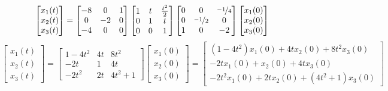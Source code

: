 \documentclass[a3paper,14pt]{extarticle}
\begin{document}
$$\begin{bmatrix}
    x_1(t) \\ x_2(t) \\ x_3(t)
\end{bmatrix} = \begin{bmatrix}
    -8 & 0 & 1 \\ 0 & -2 & 0 \\ -4 & 0 & 0
\end{bmatrix} \begin{bmatrix}
    1 & t & \frac{t^2}{2} \\ 0 & 1 & t \\ 0 & 0 & 1
\end{bmatrix} \begin{bmatrix}
    0 & 0 & \nicefrac{-1}{4} \\ 0 & \nicefrac{-1}{2} & 0 \\ 1 & 0 & -2
\end{bmatrix}\begin{bmatrix}
    x_1(0) \\ x_2(0) \\ x_3(0)
\end{bmatrix}$$
$$\begin{bmatrix}
    x_1(t) \\ x_2(t) \\ x_3(t)
\end{bmatrix} = \begin{bmatrix}
    1-4t^2 & 4t & 8t^2 \\ -2t & 1 & 4t \\ -2t^2 & 2t & 4t^2+1
\end{bmatrix}\begin{bmatrix}
    x_1(0) \\ x_2(0) \\ x_3(0)
\end{bmatrix} = \begin{bmatrix}
    (1 - 4t^2)x_1(0) + 4tx_2(0) + 8t^2x_3(0) \\
    -2tx_1(0)+x_2(0)+4tx_3(0) \\
    -2t^2x_1(0)+2tx_2(0)+(4t^2+1)x_3(0)
\end{bmatrix}$$
\end{document}
